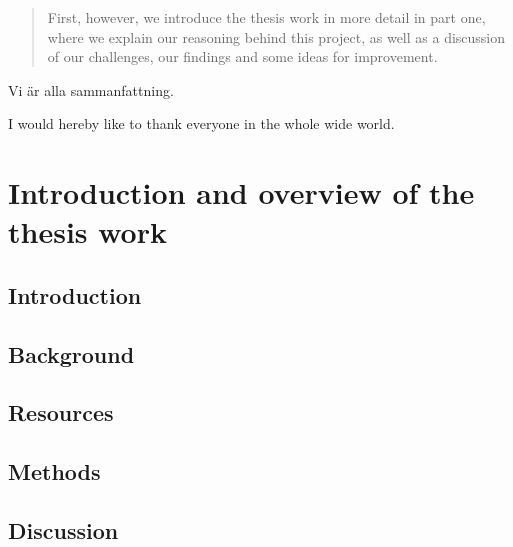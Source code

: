 \documentclass[11pt,a4paper]{DL}
\begin{document}
\begin{abstract}
    
    First, however, we introduce the thesis work in more detail in part one, where we explain our reasoning behind this project, as well as a discussion of our challenges, our findings and some ideas for improvement.
\end{abstract}

\begin{sammanfattning}
    Vi är alla sammanfattning.
\end{sammanfattning}

\begin{acknowledgements}
    I would hereby like to thank everyone in the whole wide world.
    
\bigskip


\end{acknowledgements}

\tableofcontents
\mainmatter

\part{Introduction and overview of the thesis work}	%
\label{part:kappa}

\chapter{Introduction}
\label{introduction}


\chapter{Background}
\label{background}


\chapter{Resources}
\label{resources}


\chapter{Methods}
\label{methods}


\chapter{Discussion}
\label{discussion}

\end{document}
